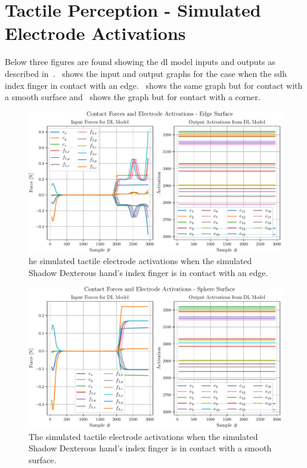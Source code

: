 \chapter{Tactile Perception - Simulated Electrode Activations}\label{app:tactile-perception-simulated-electrode-activations}

Below three figures are found showing the \gls{dl} model inputs and outputs as described in~.~ shows the input and output graphs for the case when the \gls{sdh} index finger in contact with an edge.~ shows the same graph but for contact with a smooth surface and~ shows the graph but for contact with a corner.

\begin{figure}[!h]
	\begin{center}
		\includegraphics[width=\textwidth]{chapters/1-tactile-perception/fig/matplotlib/edge-contact-graph.pdf}
	\end{center}
	\caption{he simulated tactile electrode activations when the simulated Shadow Dexterous hand's index finger is in contact with an edge.}
	\label{app:edge-contact-graph}
\end{figure}

\begin{figure}[!h]
	\begin{center}
		\includegraphics[width=\textwidth]{chapters/1-tactile-perception/fig/matplotlib/sphere-contact-graph.pdf}
	\end{center}
	\caption{The simulated tactile electrode activations when the simulated Shadow Dexterous hand's index finger is in contact with a smooth surface.}
	\label{app:smooth-contact-graph}
\end{figure}

